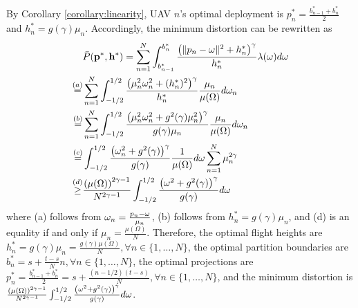 \documentclass[smallabstract,smallcaptions]{dccpaper}
\newcommand{\df}{\ensuremath{\lam}}         %
\newcommand{\bP}{\ensuremath{\vp}}          %
\newcommand{\abPo}{\ensuremath{\bar{P}}}  %
\newcommand{\bH}{\ensuremath{\vh}}          %
\newcommand{\Vor}{\ensuremath{\mathcal{V}}}         %
\newcommand{\philippstart}{\color{black}}
\newcommand{\philippend}{\color{black}}
\newcommand{\junend}{\color{black}}
\begin{document}
By Corollary \ref{corollary:linearity}, UAV $n$'s optimal deployment is $p^*_n=\frac{b^*_{n-1}+b^*_{n}}{2}$ and $h^*_n=g(\gamma)\mu_n$.
Accordingly, the minimum distortion can be rewritten as
\begin{align}
    &\abPo(\bP^*,\bH^*)=\sum_{n=1}^{N}\int_{b^*_{n-1}}^{b^*_{n}}\frac{\left(\|p_n-\ome\|^2+h^*_n\right)^{\gamma}}{h^*_n}\df(\ome) d\ome\\
    \overset{(a)}{=}&\sum_{n=1}^{N}\int_{-1/2}^{1/2} \frac{\left(\mu^2_n\ome^2_n+(h^*_n)^2\right)^{\gamma}}{h^*_n} \frac{\mu_n}{\mu(\Omega)}d\ome_n\\
    \overset{(b)}{=}&\sum_{n=1}^{N}\int_{-1/2}^{1/2}\frac{\left(\mu^2_n\ome^2_n+g^2(\gamma)\mu^2_n\right)^{\gamma}}{g(\gamma)\mu_n} \frac{\mu_n}{\mu(\Omega)}d\ome_n\\
    \overset{(c)}{=}&\int_{-1/2}^{1/2}\frac{\left(\ome^2_n+g^2(\gamma)\right)^{\gamma}}{g(\gamma)} \frac{1}{\mu(\Omega)}d\ome\sum_{n=1}^{N}\mu^{2\gamma}_n\\
    \overset{(d)}{\ge}&\frac{\left(\mu(\Omega)\right)^{2\gamma-1}}{N^{2\gamma-1}}\int_{-1/2}^{1/2}\frac{\left(\ome^2+g^2(\gamma)\right)^{\gamma}}{g(\gamma)} d\ome
  \end{align}
where (a) follows from $\omega_n=\frac{p_n-\omega}{\mu_n}$, (b) follows from $h^*_n=g(\gamma)\mu_n$, and (d) is an equality if and only if $\mu_n=\frac{\mu(\Omega)}{N}$.
Therefore, the optimal flight heights are $h^*_n=g(\gamma)\mu_n=\frac{g(\gamma)\mu(\Omega)}{N}, \forall n\in\{1,\dots,N\}$, the optimal partition boundaries are $b^*_n=s+\frac{t-s}{N}n, \forall n\in\{1,\dots,N\}$, the optimal projections are $p^*_n=\frac{b^*_{n-1}+b^*_{n}}{2}=s+\frac{(n-1/2)(t-s)}{N}, \forall n\in\{1,\dots,N\}$, and the minimum distortion is $\frac{\left(\mu(\Omega)\right)^{2\gamma-1}}{N^{2\gamma-1}}\int_{-1/2}^{1/2}\frac{\left(\omega^2+g^2(\gamma)\right)^{\gamma}}{g(\gamma)} d\omega$.
\fi
\junend
\philippstart
%
\philippend
%
%
\printbibliography
\end{document}
